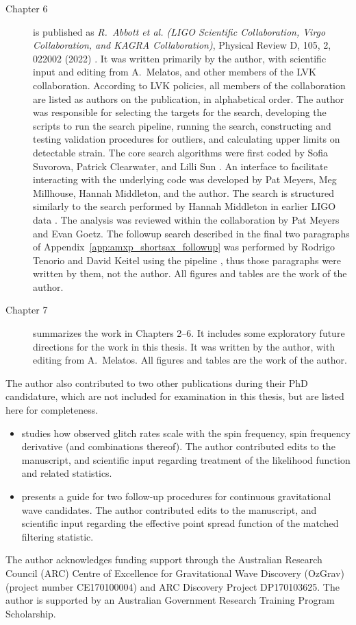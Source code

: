 \begin{description}
  \item[Chapter 6] is published as \emph{R.~Abbott et al. (LIGO Scientific Collaboration, Virgo Collaboration, and KAGRA Collaboration)}, Physical Review D, 105, 2, 022002 (2022) \citep{o3amxp}. It was written primarily by the author, with scientific input and editing from A.~Melatos, and other members of the LVK collaboration. According to LVK policies, all members of the collaboration are listed as authors on the publication, in alphabetical order. The author was responsible for selecting the targets for the search, developing the scripts to run the search pipeline, running the search, constructing and testing validation procedures for outliers, and calculating upper limits on detectable strain. The core search algorithms were first coded by Sofia Suvorova, Patrick Clearwater, and Lilli Sun \citep{Suvorova2016,Suvorova2017}. An interface to facilitate interacting with the underlying code was developed by Pat Meyers, Meg Millhouse, Hannah Middleton, and the author. The search is structured similarly to the search performed by Hannah Middleton in earlier LIGO data \citep{Middleton2020}. The analysis was reviewed within the collaboration by Pat Meyers and Evan Goetz. The followup search described in the final two paragraphs of Appendix~\ref{app:amxp_shortsax_followup} was performed by Rodrigo Tenorio and David Keitel using the {} pipeline \citep{Keitel:2021xeq}, thus those paragraphs were written by them, not the author. All figures and tables are the work of the author.
  \item[Chapter 7] summarizes the work in Chapters 2--6. It includes some exploratory future directions for the work in this thesis. It was written by the author, with editing from A.~Melatos. All figures and tables are the work of the author.
\end{description}

The author also contributed to two other publications during their PhD candidature, which are not included for examination in this thesis, but are listed here for completeness.
\begin{itemize}
  \item \citet{Millhouse2022} studies how observed glitch rates scale with the spin frequency, spin frequency derivative (and combinations thereof). The author contributed edits to the manuscript, and scientific input regarding treatment of the likelihood function and related statistics.
  \item \citet{Jones2022} presents a guide for two follow-up procedures for continuous gravitational wave candidates. The author contributed edits to the manuscript, and scientific input regarding the effective point spread function of the matched filtering statistic.
\end{itemize}

The author acknowledges funding support through the Australian Research Council (ARC) Centre of Excellence for Gravitational Wave Discovery (OzGrav) (project number CE170100004) and ARC Discovery Project DP170103625. The author is supported by an Australian Government Research Training Program Scholarship.